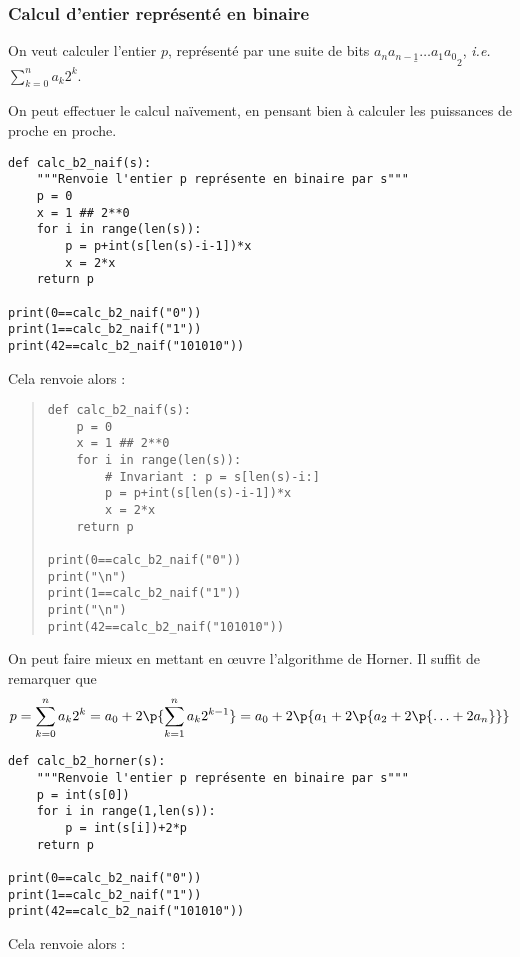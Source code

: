 \subsubsection{Calcul d'entier représenté en binaire}

On veut calculer l'entier $p$, représenté par une suite de bits
$\underline{a_{n}a_{n-1}\ldots a_{1}a_{0}}_{2}$, \emph{i.e.}
$\displaystyle\sum_{k=0}^{n}a_{k}2^{k}$.

On peut effectuer le calcul naïvement, en pensant bien à calculer les puissances de proche en proche. 

\begin{lstlisting}
def calc_b2_naif(s):
    """Renvoie l'entier p représente en binaire par s"""
    p = 0
    x = 1 ## 2**0
    for i in range(len(s)):
        p = p+int(s[len(s)-i-1])*x
        x = 2*x
    return p

print(0==calc_b2_naif("0"))
print(1==calc_b2_naif("1"))
print(42==calc_b2_naif("101010"))
\end{lstlisting}


Cela renvoie alors :
\begin{quote}
\begin{lstlisting}
def calc_b2_naif(s):
    p = 0
    x = 1 ## 2**0
    for i in range(len(s)):
        # Invariant : p = s[len(s)-i:]
        p = p+int(s[len(s)-i-1])*x
        x = 2*x
    return p

print(0==calc_b2_naif("0"))
print("\n")
print(1==calc_b2_naif("1"))
print("\n")
print(42==calc_b2_naif("101010"))
\end{lstlisting}
\end{quote}

On peut faire mieux en mettant en {\oe}uvre l'algorithme de Horner. Il suffit de remarquer que 
\begin{equation*}
  p = \sum_{k=0}^{n}a_{k}2^{k} = a_0 + 2\p{\sum_{k=1}^{n}a_{k}2^{k-1}} = a_0 + 2\p{a_1+2\p{a_2 + 2\p{\ldots + 2a_n}}}
\end{equation*}

\begin{lstlisting}
def calc_b2_horner(s):
    """Renvoie l'entier p représente en binaire par s"""
    p = int(s[0])
    for i in range(1,len(s)):
        p = int(s[i])+2*p
    return p
    
print(0==calc_b2_naif("0"))
print(1==calc_b2_naif("1"))
print(42==calc_b2_naif("101010"))
\end{lstlisting}


Cela renvoie alors :

